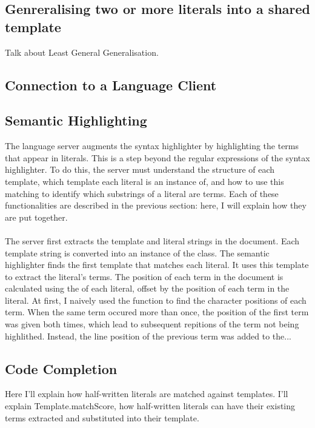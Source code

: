 \documentclass[../main.tex]{subfiles}
\begin{document}
\subsection{Genreralising two or more literals into a shared template}
Talk about Least General Generalisation.

\subsection{Connection to a Language Client}


\subsection{Semantic Highlighting}
The language server augments the syntax highlighter by highlighting the terms that appear in literals. This is a step beyond the regular expressions of the syntax highlighter. To do this, the server must understand the structure of each template, which template each literal is an instance of, and how to use this matching to identify which substrings of a literal are terms. Each of these functionalities are described in the previous section: here, I will explain how they are put together.
\\ 
\\
The server first extracts the template and literal strings in the document. Each template string is converted into an instance of the  class.
The semantic highlighter finds the first template that matches each literal. 
 It uses this template to extract the literal's terms. The position of each term in the document is calculated using the  of each literal, offset by the position of each term in the literal. At first, I naively used the  function to find the character positions of each term. When the same term occured more than once, the position of the first term was given both times, which lead to subsequent repitions of the term not being highlithed. Instead, the line position of the previous term was added to the...


\subsection{Code Completion}
Here I'll explain how half-written literals are matched against templates. I'll explain Template.matchScore, how half-written literals can have their existing terms extracted and substituted into their template. 
\end{document}
